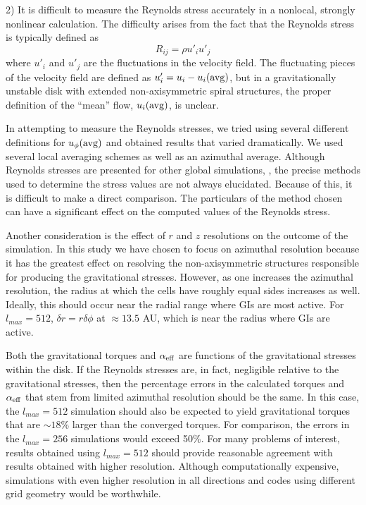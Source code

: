 \documentclass[manuscript]{aastex}
\begin{document}
2) It is difficult to measure the Reynolds stress accurately in a nonlocal, strongly nonlinear calculation. The difficulty arises from the fact that the Reynolds
stress is typically defined as 
\begin{equation}
\label{eq:reynstress}
R_{ij} = \rho u'_i u'_j
\end{equation}
where $u'_i$ and $u'_j$ are the fluctuations in the velocity field. The fluctuating pieces of the velocity
field are defined as $u'_i = u_i - u_i({\rm avg})$, but in a gravitationally unstable disk with extended
non-axisymmetric spiral structures, the proper definition of the ``mean'' flow, $u_i({\rm avg})$, is unclear.

In attempting to measure the Reynolds stresses, we tried using several different
definitions for $u_{\phi}({\rm avg})$ and obtained results that varied dramatically. We used several local
averaging schemes as well as an azimuthal average. Although Reynolds stresses are presented for other global
simulations, \citep[e.g.][]{lodato2004}, the precise methods used to determine
the stress values are not always elucidated. Because of this, it is difficult to make a direct comparison.
The particulars of the method chosen can have a significant effect on the computed values of the
Reynolds stress.

Another consideration is the effect of $r$ and $z$ resolutions on the outcome of the simulation. In this study we have chosen to focus on azimuthal resolution because it has the greatest effect on resolving the non-axisymmetric
structures responsible for producing the gravitational stresses. However, as one increases the azimuthal resolution, the radius at which the cells have roughly equal sides increases as well. Ideally, this should occur near the radial range where GIs are most active. For $l_{max} = 512$, $\delta r = r \delta \phi $ at $\approx 13.5$ AU, which is near the radius where GIs are active.

Both the gravitational torques and $\alpha_{\rm{eff}}$ are functions of the
gravitational stresses within the disk.  If the Reynolds stresses are, in fact, negligible relative to the gravitational stresses,
then the percentage errors in the calculated torques and $\alpha_{\rm{eff}}$ that stem from limited azimuthal resolution 
should be the same. In this case, the  $l_{max} = 512$ simulation should also be expected to yield
gravitational torques that are $\sim 18$\% larger than the converged torques.  For comparison, the
errors in the $l_{max} = 256$ simulations would exceed 50\%. For many problems of interest,
results obtained using $l_{max} = 512$ should provide reasonable agreement with results obtained 
with higher resolution. 
Although computationally expensive, simulations with even higher resolution in all directions and codes using different grid geometry
would be worthwhile.
\end{document}
